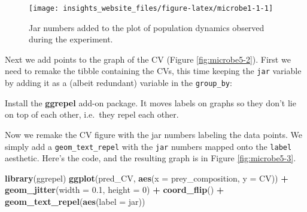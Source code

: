\documentclass[]{book}
\makeatletter
\newenvironment{Shaded}{\begin{snugshade}}{\end{snugshade}}
\newcommand{\DataTypeTok}[1]{\textcolor[rgb]{0.13,0.29,0.53}{#1}}
\newcommand{\DecValTok}[1]{\textcolor[rgb]{0.00,0.00,0.81}{#1}}
\newcommand{\FloatTok}[1]{\textcolor[rgb]{0.00,0.00,0.81}{#1}}
\newcommand{\KeywordTok}[1]{\textcolor[rgb]{0.13,0.29,0.53}{\textbf{#1}}}
\newcommand{\NormalTok}[1]{#1}
\newcommand{\OperatorTok}[1]{\textcolor[rgb]{0.81,0.36,0.00}{\textbf{#1}}}
\newcommand{\StringTok}[1]{\textcolor[rgb]{0.31,0.60,0.02}{#1}}
\newenvironment{kframe}{%
\medskip{}
\setlength{\fboxsep}{.8em}
 \def\at@end@of@kframe{}%
 \ifinner\ifhmode%
  \def\at@end@of@kframe{\end{minipage}}%
  \begin{minipage}{\columnwidth}%
 \fi\fi%
 \def\FrameCommand##1{\hskip\@totalleftmargin \hskip-\fboxsep
 \colorbox{shadecolor}{##1}\hskip-\fboxsep
     \hskip-\linewidth \hskip-\@totalleftmargin \hskip\columnwidth}%
 \MakeFramed {\advance\hsize-\width
   \@totalleftmargin\z@ \linewidth\hsize
   \@setminipage}}%
 {\par\unskip\endMakeFramed%
 \at@end@of@kframe}
\newenvironment{rmdblock}[1]
  {
  \begin{itemize}
  \renewcommand{\labelitemi}{
    \raisebox{-.7\height}[0pt][0pt]{
      {\setkeys{Gin}{width=3em,keepaspectratio}\texttt{[image: images/\#1]}}
    }
  }
  \setlength{\fboxsep}{1em}
  \begin{kframe}
  \item
  }
  {
  \end{kframe}
  \end{itemize}
  }
\newenvironment{action}
  {\begin{rmdblock}{action}}
  {\end{rmdblock}}
\makeatother
\begin{document}
\begin{figure}

{\centering \texttt{[image: insights\_website\_files/figure-latex/microbe1-1-1]} 

}

\caption{Jar numbers added to the plot of population dynamics observed during the experiment.}\label{fig:microbe1-1}
\end{figure}

Next we add points to the graph of the CV (Figure \ref{fig:microbe5-2}). First we need to remake the tibble containing the CVs, this time keeping the \texttt{jar} variable by adding it as a (albeit redundant) variable in the \texttt{group\_by}:

\begin{Shaded}
\end{Shaded}

\begin{action}
Install the \textbf{ggrepel} add-on package. It moves labels on graphs
so they don't lie on top of each other, i.e.~they repel each other.
\end{action}

Now we remake the CV figure with the jar numbers labeling the data points. We simply add a \texttt{geom\_text\_repel} with the \texttt{jar} numbers mapped onto the \texttt{label} aesthetic. Here's the code, and the resulting graph is in Figure \ref{fig:microbe5-3}.

\begin{Shaded}
\begin{Highlighting}[]
\KeywordTok{library}\NormalTok{(ggrepel)}
\KeywordTok{ggplot}\NormalTok{(pred_CV, }\KeywordTok{aes}\NormalTok{(}\DataTypeTok{x =}\NormalTok{ prey_composition, }\DataTypeTok{y =}\NormalTok{ CV)) }\OperatorTok{+}
\StringTok{  }\KeywordTok{geom_jitter}\NormalTok{(}\DataTypeTok{width =} \FloatTok{0.1}\NormalTok{, }\DataTypeTok{height =} \DecValTok{0}\NormalTok{) }\OperatorTok{+}
\StringTok{  }\KeywordTok{coord_flip}\NormalTok{() }\OperatorTok{+}
\StringTok{  }\KeywordTok{geom_text_repel}\NormalTok{(}\KeywordTok{aes}\NormalTok{(}\DataTypeTok{label =}\NormalTok{ jar))}
\end{Highlighting}
\end{Shaded}
\end{document}
